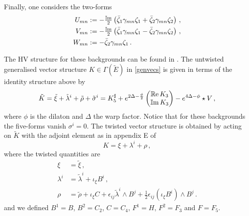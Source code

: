 \documentclass[debug]{phd}
\begin{document}
%
Finally, one considers the two-forms
%
\begin{equation} 
\label{IIB2formsbil}
	\begin{aligned}
		U_{mn} &:= -\tfrac{\operatorname{\mathbb{I}m}}{2}\left(\bar{\zeta}_1\gamma_{mn}\zeta_1 + \bar{\zeta}_2\gamma_{mn}\zeta_2\right)\, , \\
		V_{mn} &:= -\tfrac{\operatorname{\mathbb{I}m}}{2}\left(\bar{\zeta}_1\gamma_{mn}\zeta_1 - \bar{\zeta}_2\gamma_{mn}\zeta_2\right)\, , \\
		W_{mn} &:= -\bar{\zeta}_2\gamma_{mn}\zeta_1\, .
	\end{aligned}
\end{equation} 
%

The HV structure for these backgrounds can be found in \cite{AshmoreESE, Grana_Ntokos}. 
The untwisted generalised vector structure 
$K \in \Gamma(\tilde{E})$ in \eqref{genvecs} is given in terms of the identity structure above by 
%
	\begin{equation} 
	\label{eq:K_tilde_IIB}
		\begin{aligned}
			\tilde{K}= \tilde{\xi} + \tilde{\lambda}^i +\tilde{\rho} + \tilde{\sigma}^i = K_5^{\sharp} +e^{2\Delta - \frac{\phi}{2} } \begin{pmatrix} \operatorname{\mathbb{R}e} K_3 \\ \operatorname{\mathbb{I}m} K_3 \end{pmatrix} - e^{4\Delta - \phi} \star V \, ,
		\end{aligned}
	\end{equation} 
%
where $\phi$ is the dilaton and $\Delta$ the warp factor.
Notice that for these backgrounds the five-forms vanish $\sigma^i =0$. 
The twisted vector structure is obtained by acting on $\tilde K$ with the adjoint element as in appendix E of~\cite{AshmoreECY}
%	
	\begin{equation} 
	\label{eq:IIB_twisted_explicit}
	K = \xi + \lambda^i + \rho \, ,
	\end{equation} 
%
where the twisted quantities are~\cite{AshmoreESE,AshmoreECY}
%
	\begin{subequations}
	\label{IIbtwist}
		\begin{align}
			\xi &= \tilde{\xi}\, , \label{IIbtwistv} \\[1mm]
			\lambda^i & = \tilde{\lambda}^i + \iota_{\xi}B^i\, , \label{IIbtwist1} \\[1mm]
			\rho & = \tilde{\rho} + \iota_\xi C + \epsilon_{ij}\tilde{\lambda}^i \wedge B^j + \tfrac{1}{2}\epsilon_{ij}\left( \iota_\xi B^i \right)\wedge B^j\, . \label{IIbtwist3}%
		\end{align}
	\end{subequations}
%
and we defined $B^1 = B$, $B^2 = C_2$, $C = C_4$, $F^1= H$, $F^2 = F_3$ and $F=F_5$.
\end{document}

